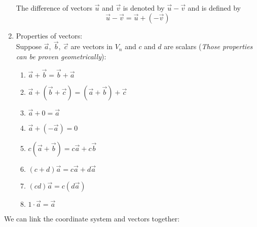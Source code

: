 \documentclass[12pt,a4paper]{article}
\def\vecv{\vec{v}}
\def\vecu{\vec{u}}
\def\veca{\vec{a}}
\def\vecb{\vec{b}}
\def\vecc{\vec{c}}
\begin{document}
\begin{enumerate}
\begin{center}
	\end{center}
 	The difference of vectors $\vecu$ and $\vecv$ is denoted by $\vecu-\vecv$ and is defined by \[\vecu-\vecv=\vecu+(-\vecv)\]
 	\item Properties of vectors: \\Suppose $\veca,\ \vecb,\ \vecc$ are vectors in $V_n$ and $c$ and $d$ are scalars (\textit{Those properties can be proven geometrically}): 
 	\begin{enumerate}
 		\item $\veca+\vecb=\vecb+\veca$
 		\item $\veca+(\vecb+\vecc)=(\veca+\vecb)+\vecc$
 		\item $\veca+0=\veca$
 		\item $\veca+(-\veca)=0$
 		\item $c(\veca+\vecb)=c\veca+c\vecb$
 		\item $(c+d)\veca=c\veca+d\veca$
 		\item $(cd)\veca=c(d\veca)$
 		\item $1\cdot\veca=\veca$
 	\end{enumerate}
\end{enumerate}
We can link the coordinate system and vectors together:  
\end{document}
